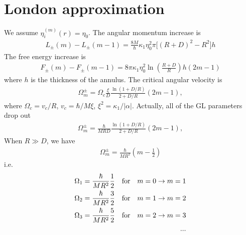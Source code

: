 \documentclass[aps,prl,preprint]{revtex4-2}
\begin{document}
\section{London approximation}
We assume $\eta_i^{(m)}(r) = \eta_0$.
The angular momentum increase is
\begin{align}
    L_\pm(m) - L_\pm(m-1)
    =\frac{8M}{\hbar}\kappa_1\eta_0^2\pi\bigg[(R+D)^2-R^2\bigg]h
\end{align}
The free energy increase is
\begin{align}
    F_\pm(m)-F_\pm(m-1)=8\pi\kappa_1\eta_0^2\ln(\frac{R+D}{R})h(2m-1)
\end{align}
where $h$ is the thickness of the annulus. The critical angular velocity is
\begin{align}
    \Omega_m^\pm=\Omega_c\frac{\xi}{D}\frac{\ln{(1+D/R)}}{2+D/R}(2m-1),
\end{align}
where $\Omega_c = v_c/R$, $v_c = \hbar/M\xi$, $\xi^2=\kappa_1/|\alpha|$.
Actually, all of the GL parameters drop out
\begin{align}
    \Omega_m^\pm=\frac{\hbar}{MRD}\frac{\ln{(1+D/R)}}{2+D/R}(2m-1),
\end{align}
When $R\gg D$, we have
\begin{align}
    \Omega_m^\pm=\frac{\hbar}{MR^2}\left(m-\frac{1}{2}\right)
\end{align}
i.e.
\begin{align}
    \Omega_1=\frac{\hbar}{MR^2}\frac{1}{2}\qq{for}m=0\rightarrow m=1\\
    \Omega_2=\frac{\hbar}{MR^2}\frac{3}{2}\qq{for}m=1\rightarrow m=2\\
    \Omega_3=\frac{\hbar}{MR^2}\frac{5}{2}\qq{for}m=2\rightarrow m=3\\
    ...
\end{align}
\end{document}
